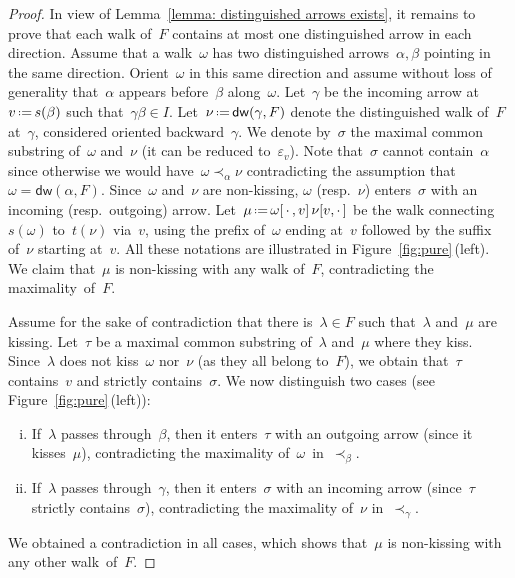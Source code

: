 \documentclass{amsart}
\theoremstyle{definition}
\newcommand{\eqdef}{\mbox{\,\raisebox{0.2ex}{\scriptsize\ensuremath{\mathrm:}}\ensuremath{=}\,}} %
\newcommand{\fref}[1]{Figure~\ref{#1}} %
\newcommand{\blossom}{^\text{\ding{96}}} %
\newcommand{\distinguishedWalk}[2]{\mathsf{dw}(#1,#2)} %
\begin{document}
\begin{proof}
In view of Lemma~\ref{lemma: distinguished arrows exists}, it remains to prove that each walk of~$F$ contains at most one distinguished arrow in each direction.
Assume that a walk~$\omega$ has two distinguished arrows~$\alpha, \beta$ pointing in the same direction.
Orient~$\omega$ in this same direction and assume without loss of generality that~$\alpha$ appears before~$\beta$ along~$\omega$.
Let~$\gamma$ be the incoming arrow at~$v \eqdef s(\beta)$ such that~$\gamma\beta \in I$.
Let~$\nu \eqdef \distinguishedWalk{\gamma}{F}$ denote the distinguished walk of~$F$ at~$\gamma$, considered oriented backward~$\gamma$.
We denote by~$\sigma$ the maximal common substring of~$\omega$ and~$\nu$ (it can be reduced to~$\varepsilon_v$).
Note that~$\sigma$ cannot contain~$\alpha$ since otherwise we would have~$\omega \prec_\alpha \nu$ contradicting the assumption that~$\omega = \distinguishedWalk{\alpha}{F}$. 
Since~$\omega$ and~$\nu$ are non-kissing, $\omega$ (resp.~$\nu$) enters~$\sigma$ with an incoming (resp.~outgoing) arrow.
Let~$\mu \eqdef \omega[\,\cdot\,, v] \, \nu[v, \cdot\,]$ be the walk connecting~$s(\omega)$ to~$t(\nu)$ via~$v$, using the prefix of~$\omega$ ending at~$v$ followed by the suffix of~$\nu$ starting at~$v$.
All these notations are illustrated in \fref{fig:pure}\,(left).
We claim that~$\mu$ is non-kissing with any walk of~$F$, contradicting the maximality~of~$F$.

Assume for the sake of contradiction that there is~$\lambda \in F$ such that~$\lambda$ and~$\mu$ are kissing.
Let~$\tau$ be a maximal common substring of~$\lambda$ and~$\mu$ where they kiss.
Since~$\lambda$ does not kiss~$\omega$ nor~$\nu$ (as they all belong to~$F$), we obtain that~$\tau$ contains~$v$ and strictly contains~$\sigma$.
We now distinguish two cases (see \fref{fig:pure}\,(left)):
\begin{enumerate}[(i)]
\item If~$\lambda$ passes through~$\beta$, then it enters~$\tau$ with an outgoing arrow (since it kisses~$\mu$), contradicting the maximality of~$\omega$~in~$\prec_\beta$.
\item If~$\lambda$ passes through~$\gamma$, then it enters~$\sigma$ with an incoming arrow (since~$\tau$ strictly contains~$\sigma$), contradicting the maximality of~$\nu$ in~$\prec_\gamma$. 
\end{enumerate}
We obtained a contradiction in all cases, which shows that~$\mu$ is non-kissing with any other walk~of~$F$.


\end{proof}
\end{document}
